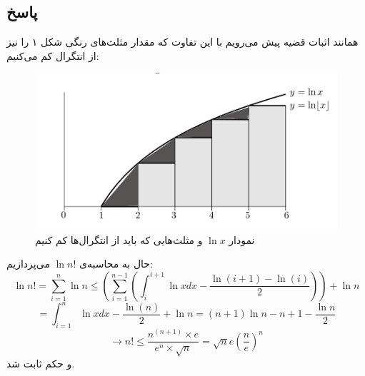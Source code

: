 \documentclass[12pt,a4paper]{article}
\begin{document}
\subsection{پاسخ}
همانند اثبات قضیه پیش می‌رویم با این تفاوت که مقدار 
مثلث‌های رنگی شکل ۱ را نیز از انتگرال کم می‌کنیم:
\begin{figure}
	\centering
	\includegraphics[width=0.7\linewidth]{1}
	\caption{نمودار $\ln x$ و مثلث‌هایی که باید از انتگرال‌ها کم کنیم}
	\label{fig:1}
\end{figure}
حال به محاسبه‌ی $\ln n!$ می‌پردازیم:
\[
\ln n! = \sum_{i=1}^{n} \ln n 
\leq \left(\sum_{i=1}^{n-1}\left(\int_{i}^{i+1}\ln x  dx - \frac{\ln(i+1)-\ln(i)}{2} \right)\right) + \ln n
\]
\[
= \int_{i=1}^n \ln x dx - \frac{\ln(n)}{2} + \ln n
= (n+1)\ln n - n + 1 - \frac{\ln n}{2}
\]
\[
\rightarrow n! \leq \frac{n^{(n+1)}\times e}{e^n \times \sqrt{n}}
= \sqrt{n}e \left(\frac{n}{e}\right)^n
\]
و حکم ثابت شد.
\end{document}
